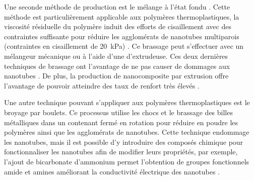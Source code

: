 Une seconde méthode de production est le mélange à l'état fondu \cite{Ma2010}. 
Cette méthode est particulièrement applicable aux polymères thermoplastiques, la viscosité résiduelle du polymère induit des efforts de cisaillement avec des contraintes suffisante pour réduire les agglomérats de nanotubes multiparois (contraintes en cisaillement de \SI[locale=FR]{20}{\kilo\pascal}) \cite{Huang2012}. 
Ce brassage peut s'effectuer avec un mélangeur mécanique ou à l'aide d'une d'extrudeuse. 
Ces deux dernières techniques de brassage ont l'avantage de ne pas causer de dommages aux nanotubes \cite{Ma2010}. 
De plus, la production de nanocomposite par extrusion offre l'avantage de pouvoir atteindre des taux de renfort très élevés \cite{Ma2010}. 

Une autre technique pouvant s'appliquer aux polymères thermoplastiques est le broyage par boulets. 
Ce processus utilise les chocs et le brassage des billes métalliques dans un contenant fermé en rotation pour réduire en poudre les polymères ainsi que les agglomérats de nanotubes.
Cette technique endommage les nanotubes, mais il est possible d'y introduire des composés chimique pour fonctionnaliser les nanotubes afin de modifier leurs propriétés, par exemple, l'ajout de bicarbonate d'ammonium permet l'obtention de groupes fonctionnels amide et amines améliorant la conductivité électrique des nanotubes \cite{Ma2010, Ma2008a}. 

